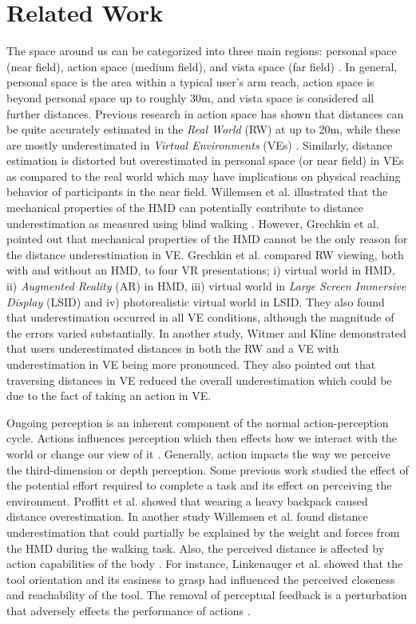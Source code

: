\chapter{Related Work}
The space around us can be categorized into three main regions: personal space (near field), action space (medium field), and vista space (far field) \cite{c95}. In general, personal space is the area within a typical user's arm reach, action space is beyond personal space up to roughly 30m, and vista space is considered all further distances. Previous research in action space has shown that distances can be quite accurately estimated in the \textit{Real World} (RW) at up to 20m, while these are mostly underestimated in \textit{Virtual Environments} (VEs) \cite{lk03,WK98,RW05,TWG+04}. Similarly, distance estimation is distorted but overestimated in personal space (or near field) in VEs as compared to the real world \cite{EAH+14,RBG+95} which may have implications on physical reaching behavior of participants in the near field. Willemsen et al. \cite{WCC+09} illustrated that the mechanical properties of the HMD can potentially contribute to distance underestimation as measured using blind walking%
. However, Grechkin et al. \cite{GNP+10} pointed out that mechanical properties of the HMD cannot be the only reason for the distance underestimation in VE. Grechkin et al. \cite{GNP+10} compared RW viewing, both with and without an HMD, to four VR presentations; i) virtual world in HMD, ii) \textit{Augmented Reality} (AR) in HMD, iii) virtual world in \textit{Large Screen Immersive Display} (LSID) and iv) photorealistic virtual world in LSID. They also found that underestimation occurred in all VE conditions, although the magnitude of the errors varied substantially. In another study, Witmer and Kline \cite{WK98} demonstrated that users underestimated distances in both the RW and a VE with underestimation in VE being more pronounced. They also pointed out that traversing distances in VE reduced the overall underestimation which could be due to the fact of taking an action in VE.

Ongoing perception is an inherent component of the normal action-perception cycle. Actions influences perception which then effects how we interact with the world or change our view of it \cite{wv05}. Generally, action impacts the way we perceive the third-dimension or depth perception. Some previous work studied the effect of the potential effort required to complete a task and its effect on perceiving the environment. Proffitt et al. \cite{ps+03} showed that wearing a heavy backpack caused distance overestimation. In another study Willemsen et al. \cite{WCC+09} found distance underestimation that could partially be explained by the weight and forces from the HMD during the walking task. Also, the perceived distance is affected by action capabilities of the body \cite{lw+09}. For instance, Linkenauger et al. \cite{lw+09} showed that the tool orientation and its easiness to grasp had influenced the perceived closeness and reachability of the tool. The removal of perceptual feedback is a perturbation that adversely effects the performance of actions \cite{BP98}.

